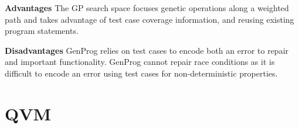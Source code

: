 \begin{compactitem}
\item[\textbf{Advantages}] 
The GP search space focuses genetic operations along a weighted path and takes advantage of test case coverage information, and reusing existing program statements.

\item[\textbf{Disadvantages}] GenProg relies on test cases to encode both an error to repair and important functionality. GenProg cannot repair race conditions as it is difficult to encode an error using test cases for non-deterministic properties.

\end{compactitem}

\section{QVM}\label{QVM}
